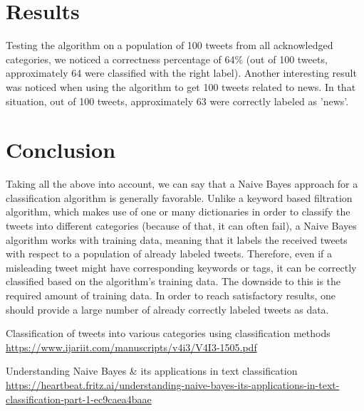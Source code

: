 \documentclass{article}
\begin{document}
\section{Results}
\large
{
\quad
Testing the algorithm on a population of 100 tweets from all acknowledged categories, we noticed a correctness percentage of 64\% (out of 100 tweets, approximately 64 were classified with the right label). Another interesting result was noticed when using the algorithm to get 100 tweets related to news. In that situation, out of 100 tweets, approximately 63 were correctly labeled as 'news'.
}

\section{Conclusion}
\large
{
\quad
Taking all the above into account, we can say that a Naive Bayes approach for a classification algorithm is generally favorable. Unlike a keyword based filtration algorithm, which makes use of one or many dictionaries in order to classify the tweets into different categories (because of that, it can often fail), a Naive Bayes algorithm works with training data, meaning that it labels the received tweets with respect to a population of already labeled tweets. Therefore, even if a misleading tweet might have corresponding keywords or tags, it can be correctly classified based on the algorithm's training data. The downside to this is the required amount of training data. In order to reach satisfactory results, one should provide a large number of already correctly labeled tweets as data.
}

\begin{thebibliography}{1}

    Classification of tweets into various categories using classification methods
    \url{https://www.ijariit.com/manuscripts/v4i3/V4I3-1505.pdf}
    
    Understanding Naive Bayes & its applications in text classification \\
    \url{https://heartbeat.fritz.ai/understanding-naive-bayes-its-applications-in-text-classification-part-1-ec9caea4baae}

\end{thebibliography}
\end{document}
